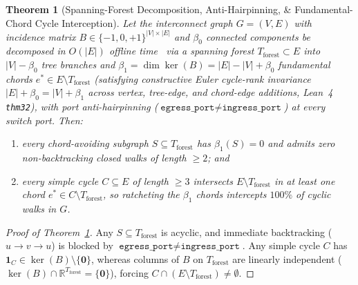 \documentclass[11pt,letterpaper]{article}
\theoremstyle{spectralthm}
\newtheorem{theorem}{Theorem}[section]
\begin{document}
\begin{theorem}[Spanning-Forest Decomposition, Anti-Hairpinning, \& Fundamental-Chord Cycle Interception]
\label{thm:forest}
Let the interconnect graph $G = (V, E)$ with incidence matrix $B \in \{-1, 0, +1\}^{|V| \times |E|}$ and $\beta_0$ connected components be decomposed in $O(|E|)$ offline time~\cite{tarjan1983data} via a spanning forest $T_{\mathrm{forest}} \subset E$ into $|V| - \beta_0$ tree branches and $\beta_1 = \dim \ker(B) = |E| - |V| + \beta_0$ fundamental chords $e^* \in E \setminus T_{\mathrm{forest}}$ (satisfying constructive Euler cycle-rank invariance $|E| + \beta_0 = |V| + \beta_1$ across vertex, tree-edge, and chord-edge additions, Lean~4 \texttt{thm32}), with port anti-hairpinning ($\texttt{egress\_port} \neq \texttt{ingress\_port}$) at every switch port. Then:
\begin{enumerate}
  \item[(i)] every chord-avoiding subgraph $S \subseteq T_{\mathrm{forest}}$ has $\beta_1(S) = 0$ and admits zero non-backtracking closed walks of length $\ge 2$; and
  \item[(ii)] every simple cycle $C \subseteq E$ of length $\ge 3$ intersects $E \setminus T_{\mathrm{forest}}$ in at least one chord $e^* \in C \setminus T_{\mathrm{forest}}$, so ratcheting the $\beta_1$ chords intercepts $100\%$ of cyclic walks in $G$.
\end{enumerate}
\end{theorem}
\begin{proof}[Proof of Theorem~\ref{thm:forest}]
Any $S \subseteq T_{\mathrm{forest}}$ is acyclic, and immediate backtracking ($u \rightarrow v \rightarrow u$) is blocked by $\texttt{egress\_port} \neq \texttt{ingress\_port}$. Any simple cycle $C$ has $\mathbf{1}_C \in \ker(B) \setminus \{\mathbf{0}\}$, whereas columns of $B$ on $T_{\mathrm{forest}}$ are linearly independent ($\ker(B) \cap \mathbb{R}^{T_{\mathrm{forest}}} = \{\mathbf{0}\}$), forcing $C \cap (E \setminus T_{\mathrm{forest}}) \neq \emptyset$.
\end{proof}
\end{document}
